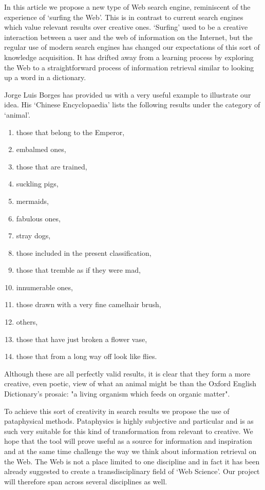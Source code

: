 In this article we propose a new type of Web search engine, reminiscent of the experience of ‘surfing the Web'. This is in contrast to current search engines which value relevant results over creative ones. ‘Surfing' used to be a creative interaction between a user and the web of information on the Internet, but the regular use of modern search engines has changed our expectations of this sort of knowledge acquisition. It has drifted away from a learning process by exploring the Web to a straightforward process of information retrieval similar to looking up a word in a dictionary.

Jorge Luis Borges has provided us with a very useful example to illustrate our idea. His ‘Chinese Encyclopaedia' \citep{Borges2000} lists the following results under the category of ‘animal'.

\begin{enumerate}
  \item those that belong to the Emperor,
  \item embalmed ones,
  \item those that are trained,
  \item suckling pigs,
  \item mermaids,
  \item fabulous ones,
  \item stray dogs,
  \item those included in the present classification,
  \item those that tremble as if they were mad,
  \item innumerable ones,
  \item those drawn with a very fine camelhair brush,
  \item others,
  \item those that have just broken a flower vase,
  \item those that from a long way off look like flies.
\end{enumerate}

Although these are all perfectly valid results, it is clear that they form a more creative, even poetic, view of what an animal might be than the Oxford English Dictionary's prosaic: "a living organism which feeds on organic matter".

To achieve this sort of creativity in search results we propose the use of pataphysical methods. Pataphysics is highly subjective and particular and is as such very suitable for this kind of transformation from relevant to creative. We hope that the tool will prove useful as a source for information and inspiration and at the same time challenge the way we think about information retrieval on the Web. The Web is not a place limited to one discipline and in fact it has been already suggested to create a transdisciplinary field of ‘Web Science'. Our project will therefore span across several disciplines as well.

